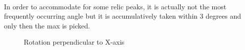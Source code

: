 \paragraph{}
In order to accommodate for some relic peaks, it is actually not the most frequently occurring angle but it is accumulatively taken within 3 degrees and only then the max is picked.

\begin{figure}[H]
     \centering
     \vfill
     \caption{Rotation perpendicular to X-axis}
     \label{fig:image_rotation}
\end{figure}

